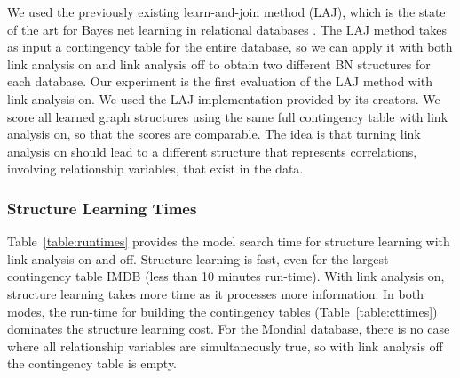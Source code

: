 \documentclass{acm_proc_article-sp}
\begin{document}
We used the previously existing learn-and-join method (LAJ), which is the state of the art for Bayes net learning in relational databases \cite{Schulte2012}. The LAJ method takes as input a contingency table for the entire database, so we can apply it with both link analysis on and link analysis off to obtain two different BN structures for each database. Our experiment is the first evaluation of the LAJ method with link analysis on. We used the LAJ implementation provided by its creators.
We score all learned graph structures using the same full contingency table with link analysis on, so that the scores are comparable. The idea is that turning link analysis on should lead to a different structure that represents correlations, involving relationship variables, that exist in the data.


\subsubsection{Structure Learning Times} 
Table~\ref{table:runtimes} provides the model search time for structure learning with link analysis on and off. Structure learning is fast, even for the largest contingency table  IMDB (less than 10 minutes run-time). With link analysis on, structure learning takes more time as it processes more information. 
In both modes, the run-time for building the contingency tables (Table~\ref{table:cttimes}) dominates the structure learning cost. For the Mondial database, there is no case where all relationship variables are simultaneously true, so with link analysis off the contingency table is empty.

\begin{table} \centering
\caption{Model Structure Learning Time  in seconds.  %
 \label{table:runtimes}}
\end{table}
\end{document}
